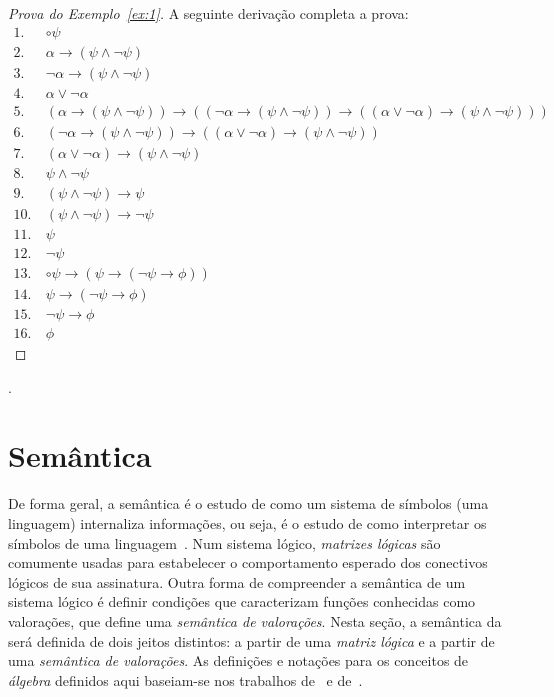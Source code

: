     \begin{proof}[Prova do Exemplo~\ref{ex:1}]
        A seguinte derivação completa a prova:
        \begin{align*}
            1.~& \circ \psi \tag{Premissa} \\
            2.~& \alpha \to (\psi \land \neg \psi) \tag{Premissa} \\
            3.~& \neg \alpha \to (\psi \land \neg \psi) \tag{Premissa} \\
            4.~& \alpha \lor \neg \alpha \tag{Ax10} \\
            5.~& (\alpha \to (\psi \land \neg \psi)) \to ((\neg \alpha \to (\psi \land \neg \psi)) \to ((\alpha \lor \neg \alpha) \to (\psi \land \neg \psi))) \tag{Ax8} \\
            6.~& (\neg \alpha \to (\psi \land \neg \psi)) \to ((\alpha \lor \neg \alpha) \to (\psi \land \neg \psi)) \tag{MP 2, 5}\\
            7.~& (\alpha \lor \neg \alpha) \to (\psi \land \neg \psi) \tag{MP 3, 6}\\
            8.~& \psi \land \neg \psi \tag{MP 4, 7} \\
            9.~& (\psi \land \neg \psi) \to \psi \tag{Ax4} \\
            10.~& (\psi \land \neg \psi) \to \neg \psi \tag{Ax5} \\
            11.~& \psi \tag{MP 8, 9}\\
            12.~& \neg \psi \tag{MP 8, 10}\\
            13.~& \circ \psi \to (\psi \to (\neg \psi \to \phi)) \tag{bc1}\\
            14.~& \psi \to (\neg \psi \to \phi) \tag{MP 1, 13}\\
            15.~& \neg \psi \to \phi \tag{MP 11, 14} \\
            16.~& \phi \tag{MP, 12, 15}
        \end{align*}
    \end{proof}

    .
\section{Semântica}\label{sec:semantica}
    De forma geral, a semântica é o estudo de como um sistema de símbolos (uma linguagem) internaliza informações, ou seja, é o estudo de como interpretar os símbolos de uma linguagem~\cite{brown2005encyclopedia}. Num sistema lógico, \textit{matrizes lógicas} são comumente usadas para estabelecer o comportamento esperado dos conectivos lógicos de sua assinatura. Outra forma de compreender a semântica de um sistema lógico é definir condições que caracterizam funções conhecidas como valorações, que define uma \textit{semântica de valorações}. Nesta seção, a semântica da \lfium{} será definida de dois jeitos distintos: a partir de uma \textit{matriz lógica} e a partir de uma \textit{semântica de valorações}. As definições e notações para os conceitos de \textit{álgebra} definidos aqui baseiam-se nos trabalhos de~ e de~.
    

